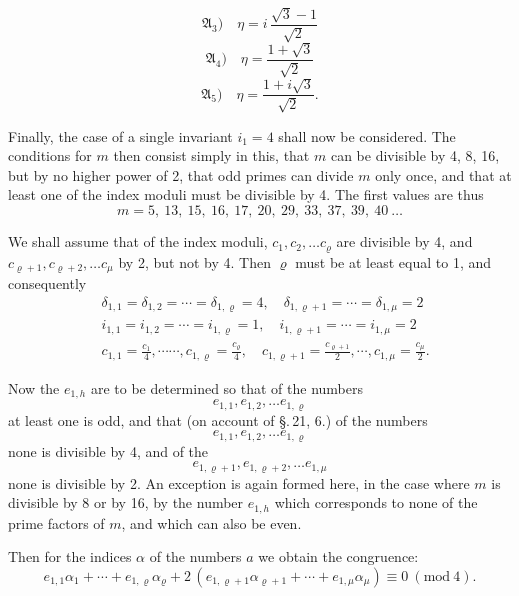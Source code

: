 \[ \mathfrak{A}_3)\quad \eta = i\,\frac{\sqrt{3}-1}{\sqrt{2}} \]
\[ \mathfrak{A}_4)\quad \eta = \frac{1+\sqrt{3}}{\sqrt{2}} \]
\[ \mathfrak{A}_5)\quad \eta = \frac{1+i\sqrt{3}}{\sqrt{2}}. \]

Finally, the case of a single invariant $i_1 = 4$ shall now
be considered. The conditions for $m$ then consist simply in
this, that $m$ can be divisible by 4, 8, 16, but by no higher
power of 2, that odd primes can divide $m$ only once, and that
at least one of the index moduli must be divisible by 4. The
first values are thus
\[ m = 5,\ 13,\ 15,\ 16,\ 17,\ 20,\ 29,\ 33,\ 37,\ 39,\ 40\ \ldots \]

We shall assume that of the index moduli,
$c_1, c_2, \ldots c_\varrho$ are divisible by 4, and $c_{\varrho+1}, c_{\varrho+2}, \ldots c_\mu$ by 2, but
not by 4. Then $\varrho$ must be at least equal to 1,
and consequently
\[ \begin{aligned}
&\delta_{1,1} = \delta_{1,2} = \cdots = \delta_{1,\varrho} = 4, \quad \delta_{1,\varrho+1} = \cdots = \delta_{1,\mu} = 2\\
&i_{1,1} = i_{1,2} = \cdots = i_{1,\varrho} = 1, \quad i_{1,\varrho+1} = \cdots = i_{1,\mu} = 2\\
&c_{1,1} = \frac{c_1}{4}, \cdots\cdots, c_{1,\varrho} = \frac{c_\varrho}{4}, \quad c_{1,\varrho+1} = \frac{c_{\varrho+1}}{2}, \cdots, c_{1,\mu} = \frac{c_\mu}{2}.
\end{aligned} \]

Now the $e_{1,h}$ are to be determined so that of the numbers
\[ e_{1,1}, e_{1,2}, \ldots e_{1,\varrho} \]
at least one is odd, and that (on account of \S.\,21, 6.) of the
numbers
\[ e_{1,1}, e_{1,2}, \ldots e_{1,\varrho} \]
none is divisible by 4, and of the
\[ e_{1,\varrho+1}, e_{1,\varrho+2}, \ldots e_{1,\mu} \]
none is divisible by 2. An exception is again formed here,
in the case where $m$ is divisible by 8 or by 16, by the number $e_{1,h}$
which corresponds to none of the prime factors of $m$, and which can also
be even.

Then for the indices $\alpha$ of the numbers $a$ we obtain the congruence:
\[ e_{1,1}\alpha_1 + \cdots + e_{1,\varrho}\alpha_\varrho + 2\,(e_{1,\varrho+1}\alpha_{\varrho+1} + \cdots + e_{1,\mu}\alpha_\mu) \equiv 0\ (\mathrm{mod}\ 4). \]
